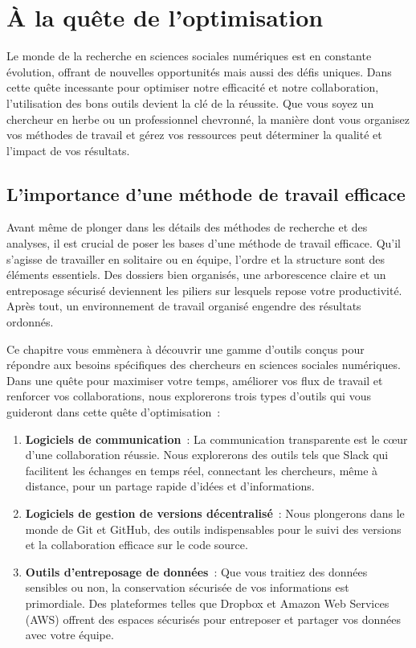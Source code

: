 \documentclass[
  letterpaper,
]{scrbook}
\begin{document}

\hypertarget{sec-chap8}{%
\chapter{À la quête de l'optimisation}\label{sec-chap8}}

Le monde de la recherche en sciences sociales numériques est en
constante évolution, offrant de nouvelles opportunités mais aussi des
défis uniques. Dans cette quête incessante pour optimiser notre
efficacité et notre collaboration, l'utilisation des bons outils devient
la clé de la réussite. Que vous soyez un chercheur en herbe ou un
professionnel chevronné, la manière dont vous organisez vos méthodes de
travail et gérez vos ressources peut déterminer la qualité et l'impact
de vos résultats.

\hypertarget{limportance-dune-muxe9thode-de-travail-efficace}{%
\section{L'importance d'une méthode de travail
efficace}\label{limportance-dune-muxe9thode-de-travail-efficace}}

Avant même de plonger dans les détails des méthodes de recherche et des
analyses, il est crucial de poser les bases d'une méthode de travail
efficace. Qu'il s'agisse de travailler en solitaire ou en équipe,
l'ordre et la structure sont des éléments essentiels. Des dossiers bien
organisés, une arborescence claire et un entreposage sécurisé deviennent
les piliers sur lesquels repose votre productivité. Après tout, un
environnement de travail organisé engendre des résultats ordonnés.

Ce chapitre vous emmènera à découvrir une gamme d'outils conçus pour
répondre aux besoins spécifiques des chercheurs en sciences sociales
numériques. Dans une quête pour maximiser votre temps, améliorer vos
flux de travail et renforcer vos collaborations, nous explorerons trois
types d'outils qui vous guideront dans cette quête d'optimisation~:

\begin{enumerate}
\def\labelenumi{\arabic{enumi}.}
\item
  \textbf{Logiciels de communication}~: La communication transparente
  est le cœur d'une collaboration réussie. Nous explorerons des outils
  tels que Slack qui facilitent les échanges en temps réel, connectant
  les chercheurs, même à distance, pour un partage rapide d'idées et
  d'informations.
\item
  \textbf{Logiciels de gestion de versions décentralisé}~: Nous
  plongerons dans le monde de Git et GitHub, des outils indispensables
  pour le suivi des versions et la collaboration efficace sur le code
  source.
\item
  \textbf{Outils d'entreposage de données}~: Que vous traitiez des
  données sensibles ou non, la conservation sécurisée de vos
  informations est primordiale. Des plateformes telles que Dropbox et
  Amazon Web Services (AWS) offrent des espaces sécurisés pour
  entreposer et partager vos données avec votre équipe.
\end{enumerate}
\end{document}
